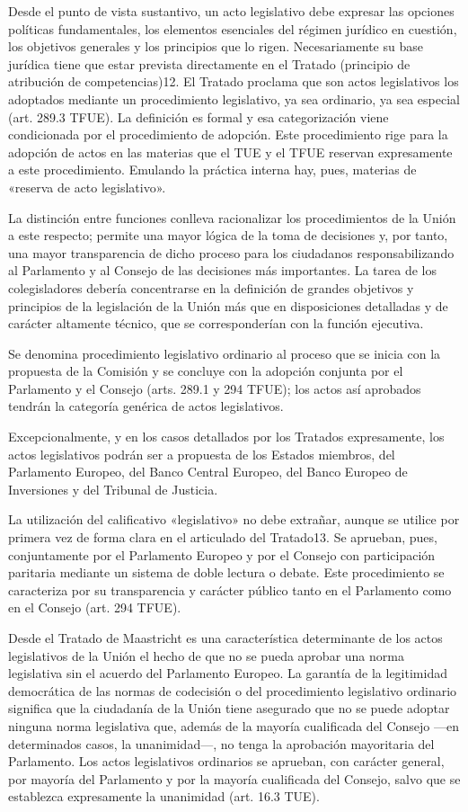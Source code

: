 \documentclass[10pt,a4paper]{article}
\begin{document}
Desde el punto de vista sustantivo, un acto legislativo debe expresar las opciones políticas fundamentales, los elementos esenciales del régimen jurídico en cuestión, los objetivos generales y los principios que lo rigen. Necesariamente su base jurídica tiene que estar prevista directamente en el Tratado (principio de atribución de competencias)12.
El Tratado proclama que son actos legislativos los adoptados mediante un procedimiento legislativo, ya sea ordinario, ya sea especial (art. 289.3 TFUE). La definición es formal y esa categorización viene condicionada por el procedimiento de adopción. Este procedimiento rige para la adopción de actos en las materias que el TUE y el TFUE reservan expresamente a este procedimiento. Emulando la práctica interna hay, pues, materias de «reserva de acto legislativo».

La distinción entre funciones conlleva racionalizar los  procedimientos de la Unión a este respecto; permite una mayor lógica de la toma de decisiones y, por tanto, una mayor transparencia de dicho proceso para los ciudadanos responsabilizando al Parlamento y al Consejo de las decisiones más importantes. La tarea de los colegisladores debería concentrarse en la definición de grandes objetivos y principios de la legislación de la Unión más que en disposiciones detalladas y de carácter altamente técnico, que se corresponderían con la función ejecutiva.

Se denomina procedimiento legislativo ordinario al proceso que
se inicia con la propuesta de la Comisión y se concluye con la
adopción conjunta por el Parlamento y el Consejo (arts. 289.1 y 294
TFUE); los actos así aprobados tendrán la categoría genérica de
actos legislativos.

Excepcionalmente, y en los casos detallados por los Tratados  expresamente, los actos legislativos podrán ser a propuesta de los Estados miembros, del Parlamento Europeo, del Banco Central Europeo, del Banco Europeo de Inversiones y del Tribunal de Justicia.

La utilización del calificativo «legislativo» no debe extrañar, aunque se utilice por primera vez de forma clara en el articulado del Tratado13. Se aprueban, pues, conjuntamente por el Parlamento Europeo y por el Consejo con participación paritaria mediante un sistema de doble lectura o debate. Este procedimiento se caracteriza por su transparencia y carácter público tanto en el Parlamento como en el Consejo (art. 294 TFUE).

Desde el Tratado de Maastricht es una característica determinante de los actos legislativos de la Unión el hecho de que no se pueda aprobar una norma legislativa sin el acuerdo del Parlamento Europeo. La garantía de la legitimidad democrática de las normas de codecisión o del procedimiento legislativo ordinario significa que la ciudadanía de la Unión tiene asegurado que no se puede adoptar ninguna norma legislativa que, además de la mayoría cualificada del Consejo —en determinados casos, la unanimidad—, no tenga la aprobación mayoritaria del Parlamento. Los actos legislativos ordinarios se aprueban, con carácter general, por mayoría del Parlamento y por la mayoría cualificada del Consejo, salvo que se establezca expresamente la unanimidad (art. 16.3 TUE).
\end{document}

